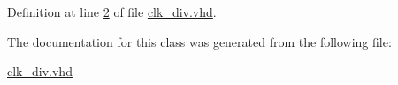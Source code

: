 \hypertarget{classclk__div_a241c3e72dd8024cc8ae831b1b2aed7db}{}
\subsubsection[{S\+T\+D\+\_\+\+L\+O\+G\+I\+C\+\_\+\+U\+N\+S\+I\+G\+N\+E\+D}]{\hspace{0.3cm}{\ttfamily [Package]}}\label{classclk__div_a241c3e72dd8024cc8ae831b1b2aed7db}


Definition at line \hyperlink{clk__div_8vhd_source_l00002}{2} of file \hyperlink{clk__div_8vhd_source}{clk\+\_\+div.\+vhd}.



The documentation for this class was generated from the following file\+:\begin{DoxyCompactItemize}
\item 
\hyperlink{clk__div_8vhd}{clk\+\_\+div.\+vhd}\end{DoxyCompactItemize}
